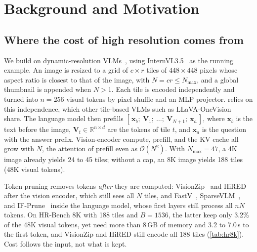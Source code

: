 \section{Background and Motivation}
\label{sec:motivation}

\subsection{Where the cost of high resolution comes from}
\label{sec:prelim}

We build on dynamic-resolution VLMs~\cite{internvl15}, using InternVL3.5~\cite{internvl35} as the running
example. An image is resized to a grid of $c\times r$ tiles of $448\times448$ pixels whose aspect ratio is
closest to that of the image, with $N=cr\le N_{\max}$, and a global thumbnail is appended when $N>1$. Each
tile is encoded independently and turned into $n=256$ visual tokens by pixel shuffle and an MLP projector.
\method relies on this independence, which other tile-based VLMs such as LLaVA-OneVision~\cite{llavaov}
share. The language model then prefills $[\,\mathbf{x}_b;\ \mathbf{V}_1;\ \dots;\ \mathbf{V}_{N+1};\
\mathbf{x}_a\,]$, where $\mathbf{x}_b$ is the text before the image, $\mathbf{V}_t\in\mathbb{R}^{n\times d}$
are the tokens of tile $t$, and $\mathbf{x}_a$ is the question with the answer prefix. Vision-encoder
compute, prefill, and the KV cache all grow with $N$, the attention of prefill even as $\mathcal{O}(N^2)$.
With $N_{\max}=47$, a 4K image already yields 24 to 45 tiles; without a cap, an 8K image yields 188 tiles
(48K visual tokens).

Token pruning removes tokens \emph{after} they are computed: VisionZip~\cite{visionzip} and
HiRED~\cite{hired} after the vision encoder, which still sees all $N$ tiles, and FastV~\cite{fastv},
SparseVLM~\cite{sparsevlm}, and IF-Prune~\cite{ifprune} inside the language model, whose first layers still
process all $nN$ tokens. On HR-Bench 8K with 188 tiles and $B=1536$, the latter keep only 3.2\% of the 48K
visual tokens, yet need more than 8\,GB of memory and 3.2 to 7.0\,s to the first token, and VisionZip and
HiRED still encode all 188 tiles (\cref{tab:hr8k}). Cost follows the input, not what is kept.

